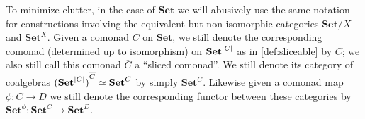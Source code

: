 \documentclass[11pt, oneside, article]{memoir}
\theoremstyle{plain}
\theoremstyle{definition}
\theoremstyle{remark}
\newenvironment{convention}
{\renewcommand\qedsymbol{$\lrcorner$}%
  \pushQED{\qed}\myconvention}
{\popQED\endmyconvention}
\DeclarePairedDelimiter{\abs}{\lvert}{\rvert}
\newcommand{\namedcat}[1]{\mathbf{#1}}
\newcommand{\Set}{\namedcat{Set}}
\newcommand{\CoalgOn}[2]{{#2}^{#1}}
\newcommand{\CoalgSet}[1]{\CoalgOn{#1}{\Set}}
\newcommand{\clift}[1]{\overline{#1}}
\newcommand{\pts}[1]{{\abs{#1}}}
\newcommand{\com}[2]{{#1}^{#2}}
\newcommand{\cmnd}[1]{{#1}}
\newcommand{\xX}{X}
\newcommand{\cC}{\cmnd{C}}
\newcommand{\cD}{\cmnd{D}}
\newcommand{\CSet}{\CoalgSet{\cC}}
\newcommand{\DSet}{\CoalgSet{\cD}}
\newcommand{\SetpC}{\Set^\pts{\cC}}
\begin{document}
\begin{convention}\label{rem:indexedsliced}
  To minimize clutter, in the case of $\Set$ we will abusively use the
  same notation for constructions involving the equivalent but
  non-isomorphic categories $\Set/\xX$ and $\Set^\xX$. Given a comonad
  $\cC$ on $\Set$, we still denote the corresponding comonad
  (determined up to isomorphism) on $\SetpC$ as in
  \cref{def:sliceable} by $\clift{\cC}$; we also still call this
  comonad $\clift{\cC}$ a ``sliced comonad''. We still denote its
  category of coalgebras
  $\CoalgOn{\clift{\cC}}{(\SetpC)} \simeq \CSet$ by simply $\CSet$.
  Likewise given a comonad map $\phi \colon \cC \to \cD$ we still
  denote the corresponding functor between these categories by
  $\com{\Set}{\phi} \colon \CSet \to \DSet$.
\end{convention}
\end{document}
